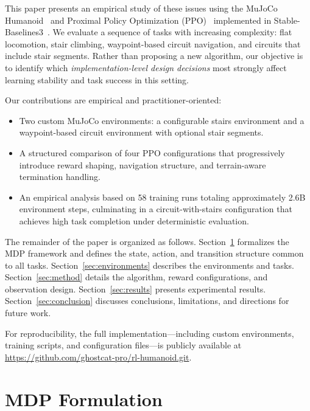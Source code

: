 \documentclass[conference]{IEEEtran}
\begin{document}
This paper presents an empirical study of these issues using the MuJoCo Humanoid~\cite{todorov2012mujoco} and Proximal Policy Optimization (PPO)~\cite{schulman2017ppo} implemented in Stable-Baselines3~\cite{raffin2021sb3}.
We evaluate a sequence of tasks with increasing complexity: flat locomotion, stair climbing, waypoint-based circuit navigation, and circuits that include stair segments.
Rather than proposing a new algorithm, our objective is to identify which \emph{implementation-level design decisions} most strongly affect learning stability and task success in this setting.

Our contributions are empirical and practitioner-oriented:
\begin{itemize}
    \item Two custom MuJoCo environments: a configurable stairs environment and a waypoint-based circuit environment with optional stair segments.
    \item A structured comparison of four PPO configurations that progressively introduce reward shaping, navigation structure, and terrain-aware termination handling.
    \item An empirical analysis based on 58 training runs totaling approximately 2.6B environment steps, culminating in a circuit-with-stairs configuration that achieves high task completion under deterministic evaluation.
\end{itemize}

The remainder of the paper is organized as follows. Section~\ref{sec:mdp} formalizes the MDP framework and defines the state, action, and transition structure common to all tasks. Section~\ref{sec:environments} describes the environments and tasks. Section~\ref{sec:method} details the algorithm, reward configurations, and observation design. Section~\ref{sec:results} presents experimental results. Section~\ref{sec:conclusion} discusses conclusions, limitations, and directions for future work.

For reproducibility, the full implementation---including custom environments, training scripts, and configuration files---is publicly available at \url{https://github.com/ghostcat-pro/rl-humanoid.git}.



\section{MDP Formulation}
\label{sec:mdp}
\end{document}
